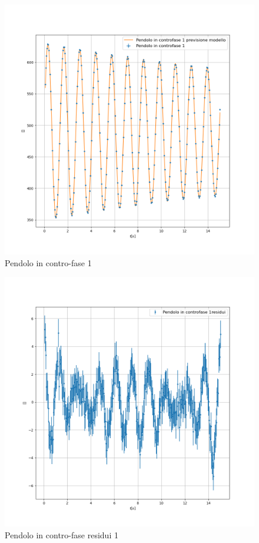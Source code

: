 \documentclass{article}
\begin{document}
                \begin{figure}[h!]
                    \centering
                    \includegraphics[width=1\linewidth]{Pendolo in controfase 1.png}
                    \caption{Pendolo in contro-fase 1}
                    \label{fig:pc}
                \end{figure}

                \begin{figure}[h! ]
                    \centering
                    \includegraphics[width=1\linewidth]{Pendolo in controfase 1_residuals.png}
                    \caption{Pendolo in contro-fase residui 1}
                    \label{fig:pcres}
                \end{figure}
\end{document}
